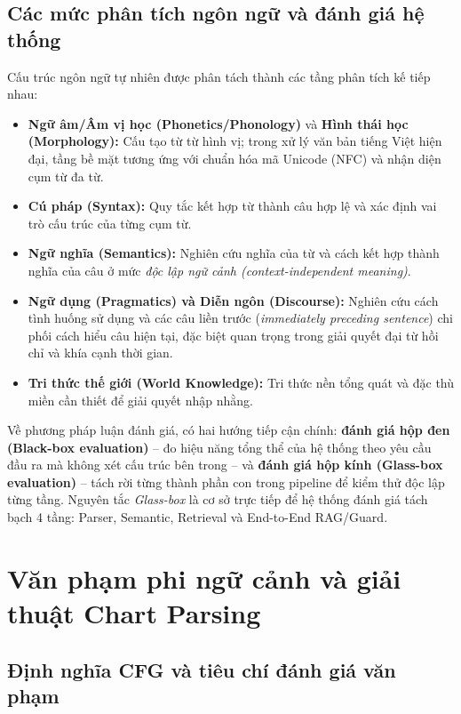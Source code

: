 \subsection{Các mức phân tích ngôn ngữ và đánh giá hệ thống}

Cấu trúc ngôn ngữ tự nhiên được phân tách thành các tầng phân tích kế tiếp nhau:
\begin{itemize}
  \item \textbf{Ngữ âm/Âm vị học (Phonetics/Phonology)} và \textbf{Hình thái học (Morphology):} Cấu tạo từ từ hình vị; trong xử lý văn bản tiếng Việt hiện đại, tầng bề mặt tương ứng với chuẩn hóa mã Unicode (NFC) và nhận diện cụm từ đa từ.
  \item \textbf{Cú pháp (Syntax):} Quy tắc kết hợp từ thành câu hợp lệ và xác định vai trò cấu trúc của từng cụm từ.
  \item \textbf{Ngữ nghĩa (Semantics):} Nghiên cứu nghĩa của từ và cách kết hợp thành nghĩa của câu ở mức \emph{độc lập ngữ cảnh (context-independent meaning)}.
  \item \textbf{Ngữ dụng (Pragmatics) và Diễn ngôn (Discourse):} Nghiên cứu cách tình huống sử dụng và các câu liền trước (\emph{immediately preceding sentence}) chi phối cách hiểu câu hiện tại, đặc biệt quan trọng trong giải quyết đại từ hồi chỉ và khía cạnh thời gian.
  \item \textbf{Tri thức thế giới (World Knowledge):} Tri thức nền tổng quát và đặc thù miền cần thiết để giải quyết nhập nhằng.
\end{itemize}

Về phương pháp luận đánh giá, có hai hướng tiếp cận chính: \textbf{đánh giá hộp đen (Black-box evaluation)} -- đo hiệu năng tổng thể của hệ thống theo yêu cầu đầu ra mà không xét cấu trúc bên trong -- và \textbf{đánh giá hộp kính (Glass-box evaluation)} -- tách rời từng thành phần con trong pipeline để kiểm thử độc lập từng tầng. Nguyên tắc \emph{Glass-box} là cơ sở trực tiếp để hệ thống đánh giá tách bạch 4 tầng: Parser, Semantic, Retrieval và End-to-End RAG/Guard.

\section{Văn phạm phi ngữ cảnh và giải thuật Chart Parsing}

\subsection{Định nghĩa CFG và tiêu chí đánh giá văn phạm}

